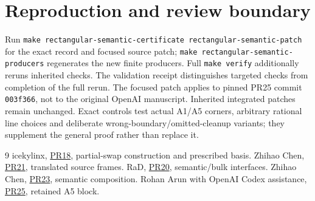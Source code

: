 \documentclass[11pt]{article}
\begin{document}
\section{Reproduction and review boundary}
Run \texttt{make rectangular-semantic-certificate rectangular-semantic-patch} for the exact record and focused source patch; \texttt{make rectangular-semantic-producers} regenerates the new finite producers. Full \texttt{make verify} additionally reruns inherited checks. The validation receipt distinguishes targeted checks from completion of the full rerun. The focused patch applies to pinned PR25 commit \texttt{003f366}, not to the original OpenAI manuscript. Inherited integrated patches remain unchanged. Exact controls test actual A1/A5 corners, arbitrary rational line choices and deliberate wrong-boundary/omitted-cleanup variants; they supplement the general proof rather than replace it.

\begin{thebibliography}{9}
 icekylinx, \href{https://github.com/CrocSwap/integer-mult-bounds/pull/18}{PR18}, partial-swap construction and prescribed basis.
 Zhihao Chen, \href{https://github.com/CrocSwap/integer-mult-bounds/pull/21}{PR21}, translated source frames.
 RaD, \href{https://github.com/CrocSwap/integer-mult-bounds/pull/20}{PR20}, semantic/bulk interfaces.
 Zhihao Chen, \href{https://github.com/CrocSwap/integer-mult-bounds/pull/23}{PR23}, semantic composition.
 Rohan Arun with OpenAI Codex assistance, \href{https://github.com/CrocSwap/integer-mult-bounds/pull/25}{PR25}, retained A5 block.
\end{thebibliography}
\end{document}
